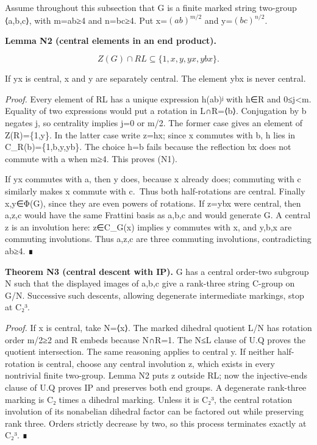 \documentclass[
  11pt,
  a4paper,
]{article}
\begin{document}
Assume throughout this subsection that G is a finite marked string
two-group ⟨a,b,c⟩, with m=\textbar ab\textbar≥4 and
n=\textbar bc\textbar≥4. Put x=\((ab)^{m/2}\) and y=\((bc)^{n/2}\).

\textbf{Lemma N2 (central elements in an end product).}

\[
Z(G)\cap RL\subseteq\{1,x,y,yx,ybx\}.
\tag{N1}
\]

If yx is central, x and y are separately central. The element ybx is
never central.

\emph{Proof.} Every element of RL has a unique expression h(ab)ʲ with
h∈R and 0≤j\textless m. Equality of two expressions would put a rotation
in L∩R=⟨b⟩. Conjugation by b negates j, so centrality implies j=0 or
m/2. The former case gives an element of Z(R)=\{1,y\}. In the latter
case write z=hx; since x commutes with b, h lies in
C\_R(b)=\{1,b,y,yb\}. The choice h=b fails because the reflection bx
does not commute with a when m≥4. This proves (N1).

If yx commutes with a, then y does, because x already does; commuting
with c similarly makes x commute with c.~Thus both half-rotations are
central. Finally x,y∈Φ(G), since they are even powers of rotations. If
z=ybx were central, then a,z,c would have the same Frattini basis as
a,b,c and would generate G. A central z is an involution here: z∈C\_G(x)
implies y commutes with x, and y,b,x are commuting involutions. Thus
a,z,c are three commuting involutions, contradicting
\textbar ab\textbar≥4. ∎

\textbf{Theorem N3 (central descent with IP).} G has a central order-two
subgroup N such that the displayed images of a,b,c give a rank-three
string C-group on G/N. Successive such descents, allowing degenerate
intermediate markings, stop at C₂³.

\emph{Proof.} If x is central, take N=⟨x⟩. The marked dihedral quotient
L/N has rotation order m/2≥2 and R embeds because N∩R=1. The N≤L clause
of U.Q proves the quotient intersection. The same reasoning applies to
central y. If neither half-rotation is central, choose any central
involution z, which exists in every nontrivial finite two-group. Lemma
N2 puts z outside RL; now the injective-ends clause of U.Q proves IP and
preserves both end groups. A degenerate rank-three marking is C₂ times a
dihedral marking. Unless it is C₂³, the central rotation involution of
its nonabelian dihedral factor can be factored out while preserving rank
three. Orders strictly decrease by two, so this process terminates
exactly at C₂³. ∎
\end{document}
